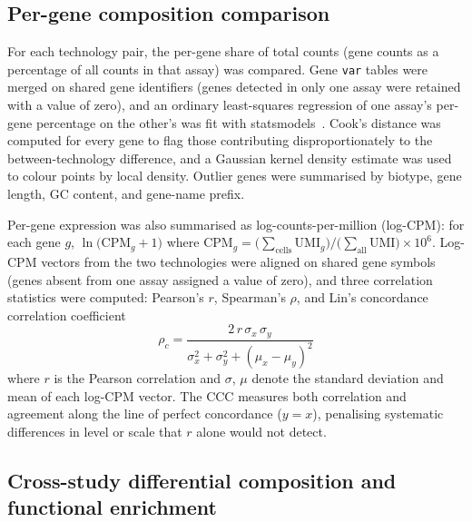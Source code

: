 \subsection{Per-gene composition comparison}

For each technology pair, the per-gene share of total counts (gene counts as a
percentage of all counts in that assay) was compared. Gene \texttt{var} tables were
merged on shared gene identifiers (genes detected in only one assay were retained
with a value of zero), and an ordinary least-squares regression of one assay's
per-gene percentage on the other's was fit with statsmodels~\cite{seabold2010statsmodels}. Cook's distance was
computed for every gene to flag those contributing disproportionately to the
between-technology difference, and a Gaussian kernel density estimate was used to
colour points by local density. Outlier genes were summarised by biotype, gene
length, GC content, and gene-name prefix.

Per-gene expression was also summarised as log-counts-per-million (log-CPM): for each gene $g$,
$\ln\!\bigl(\mathrm{CPM}_g + 1\bigr)$ where $\mathrm{CPM}_g = \bigl(\sum_{\text{cells}} \mathrm{UMI}_g\bigr) \big/ \bigl(\sum_{\text{all}} \mathrm{UMI}\bigr) \times 10^6$.
Log-CPM vectors from the two technologies were aligned on shared gene symbols (genes absent from one assay assigned a value of zero), and three correlation statistics were computed: Pearson's $r$, Spearman's $\rho$, and Lin's concordance correlation coefficient~\cite{lin1989ccc}
\begin{equation*}
\rho_c = \frac{2\,r\,\sigma_x\,\sigma_y}{\sigma_x^2 + \sigma_y^2 + (\mu_x - \mu_y)^2}
\end{equation*}
where $r$ is the Pearson correlation and $\sigma$, $\mu$ denote the standard deviation and mean of each log-CPM vector. The CCC measures both correlation and agreement along the line of perfect concordance ($y = x$), penalising systematic differences in level or scale that $r$ alone would not detect.

\subsection{Cross-study differential composition and functional enrichment}

